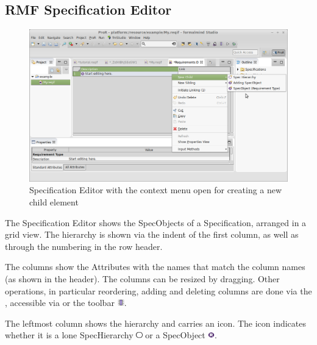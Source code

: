 \subsection{RMF Specification Editor}
\label{sec:spec-editor}

\begin{figure}
  \centering
  \includegraphics[width=\linewidth]{../rmf-images/default_spec_view.png}
  \caption{Specification Editor with the context menu open for creating a new child element}
  \label{fig:default specification editor}
\end{figure}

The Specification Editor shows the SpecObjects of a Specification, arranged in a grid view.  The hierarchy is shown via the indent of the first column, as well as through the numbering in the row header.

The columns show the Attributes with the names that match the column names (as shown in the header).  The columns can be resized by dragging.  Other operations, in particular reordering, adding and deleting columns are done via the , accessible via  or the toolbar \includegraphics[height=0.8em]{../rmf-images/icons/full/obj16/Column.png}. 

The leftmost column shows the hierarchy and carries an icon.  The icon indicates whether it is a lone SpecHierarchy \includegraphics[height=0.8em]{../rmf-images/icons/full/obj16/spechierarchy.png} or a SpecObject \includegraphics[height=0.8em]{../rmf-images/icons/full/obj16/requirement.png}.

